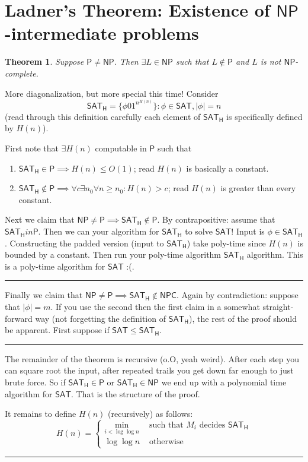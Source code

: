 \documentclass[twoside]{article}
\newcounter{lecnum}
\newtheorem{theorem}{Theorem}[lecnum]
\newenvironment{proof}{{\bf Proof:}}{\hfill\rule{2mm}{2mm}}
\begin{document}
\section{Ladner's Theorem: Existence of $\mathsf{NP}$-intermediate problems}

\begin{theorem}
Suppose $\mathsf{P} \neq \mathsf{NP}$. Then $\exists L \in \mathsf{NP}$ such that $L \notin \mathsf{P}$ and $L$ is not $\mathsf{NP}$-complete. 
\end{theorem}
\begin{proof}
More diagonalization, but more special this time! Consider 
\[\mathsf{SAT_H} = \{\phi 0 1^{n^{H(n)}}\}: \phi \in \mathsf{SAT}, |\phi| = n\]
(read through this definition carefully each element of $\mathsf{SAT_H}$ is specifically defined by $H(n)$).

First note that $\exists H(n)$ computable in $\mathsf{P}$ such that
\begin{enumerate}
\item $\mathsf{SAT_H} \in \mathsf{P} \implies H(n) \leq O(1)$; read $H(n)$ is basically a constant. 
\item $\mathsf{SAT_H} \notin \mathsf{P} \implies \forall c\exists n_0 \forall n\geq n_0: H(n) > c$; read $H(n)$ is greater than every constant.
\end{enumerate}

Next we claim that $\mathsf{NP} \neq \mathsf{P} \implies \mathsf{SAT_H} \notin \mathsf{P}$.
\begin{proof}
By contrapositive: assume that $\mathsf{SAT_H} in \mathsf{P}$. Then we can your algorithm for $\mathsf{SAT_H}$ to solve $\mathsf{SAT}$! Input is $\phi \in \mathsf{SAT_H}$. Constructing the padded version (input to $\mathsf{SAT_H}$) take poly-time since $H(n)$ is bounded by a constant. Then run your poly-time algorithm $\mathsf{SAT_H}$ algorithm. This is a poly-time algorithm for $\mathsf{SAT}$ :(. 
\end{proof}

Finally we claim that $\mathsf{NP} \neq \mathsf{P} \implies \mathsf{SAT_H} \notin \mathsf{NPC}$. 
\begin{proof}
Again by contradiction: suppose that $|\phi| = m$. If you use the second then the first claim in a somewhat straight-forward way (not forgetting the definition of $\mathsf{SAT_H}$), the rest of the proof should be apparent. First suppose if $\mathsf{SAT} \leq \mathsf{SAT_H}$.
\end{proof}

The remainder of the theorem is recursive (o.O, yeah weird). After each step you can square root the input, after repeated trails you get down far enough to just brute force. So if $\mathsf{SAT_H} \in \mathsf{P}$ or $\mathsf{SAT_H} \in \mathsf{NP}$ we end up with a polynomial time algorithm for $\mathsf{SAT}$. That is the structure of the proof.

It remains to define $H(n)$ (recursively) as follows:
\[
H(n) = \begin{cases}
\min_{i < \log\log n} &\mbox{ such that } M_i \mbox{ decides } \mathsf{SAT_H} \\
\log\log n &\mbox{ otherwise }
\end{cases}
\]
\end{proof}
\end{document}
